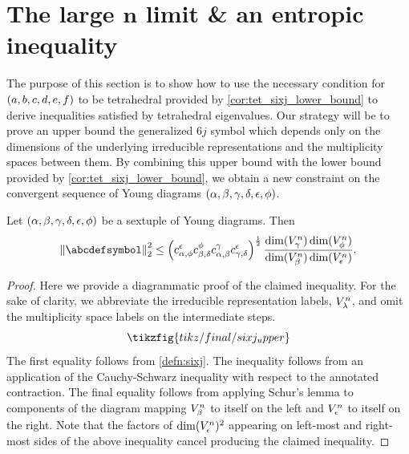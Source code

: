 \documentclass[notitlepage, 10pt]{article}
\begin{document}
\clearpage
\section{The large \texorpdfstring{$\boldsymbol{n}$}{n} limit \& an entropic inequality}
\label{sec:large_n}

The purpose of this section is to show how to use the necessary condition for $(a,b,c,d,e,f)$ to be tetrahedral provided by \cref{cor:tet_sixj_lower_bound} to derive inequalities satisfied by tetrahedral eigenvalues.
Our strategy will be to prove an upper bound the generalized $6j$ symbol which depends only on the dimensions of the underlying irreducible representations and the multiplicity spaces between them.
By combining this upper bound with the lower bound provided by \cref{cor:tet_sixj_lower_bound}, we obtain a new constraint on the convergent sequence of Young diagrams $(\alpha,\beta,\gamma,\delta,\epsilon,\phi)$.

\begin{thm}
    \label{thm:sixj_ssa_bound}
    Let $(\alpha,\beta,\gamma,\delta,\epsilon,\phi)$ be a sextuple of Young diagrams.
    Then
    \begin{equation}
        \norm{\abcdefsymbol}_{2}^{2}
        \leq \left(c_{\ya,\yf}^{\ye}c_{\yb,\yd}^{\yf}c_{\ya,\yb}^{\yc}c_{\yc,\yd}^{\ye}\right)^{\frac{1}{2}} \frac{\dim(V_{\yc}^n) \dim(V_{\yf}^n)}{\dim(V_{\yb}^n) \dim(V_{\ye}^n)}.
    \end{equation}
\end{thm}
\begin{proof}
    Here we provide a diagrammatic proof of the claimed inequality.
    For the sake of clarity, we abbreviate the irreducible representation labels, $V_{\lambda}^{n}$, and omit the multiplicity space labels on the intermediate steps.
    \begin{equation}
        \tikzfig{tikz/final/sixj_upper}
    \end{equation}
    The first equality follows from \cref{defn:sixj}.
    The inequality follows from an application of the Cauchy-Schwarz inequality with respect to the annotated contraction.
    The final equality follows from applying Schur's lemma to components of the diagram mapping $V_{\beta}^{n}$ to itself on the left and $V_{\epsilon}^{n}$ to itself on the right.
    Note that the factors of $\dim(V_{\epsilon}^{n})^2$ appearing on left-most and right-most sides of the above inequality cancel producing the claimed inequality.
\end{proof}
\end{document}
